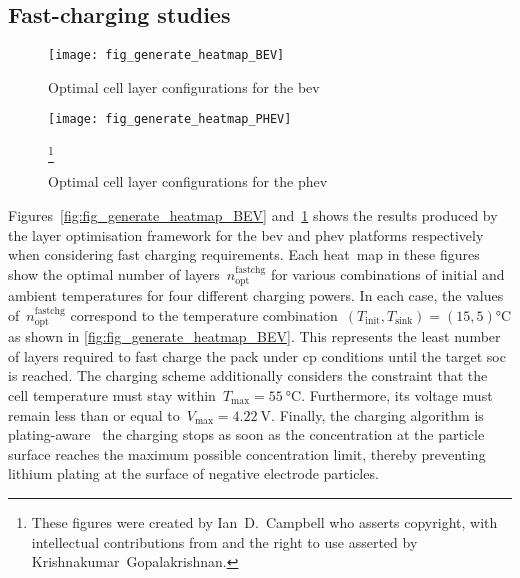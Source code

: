 \subsection{Fast-charging studies}

\begin{figure}[p]
    \begin{minipage}[t]{\textwidth}
        \centering
        \texttt{[image: fig\_generate\_heatmap\_BEV]}
        \captionsetup{labelsep=note}
        \caption[Optimal cell layer configurations for the \gls{bev}, presented for a range of fast charging powers and thermal conditions]{Optimal cell layer configurations for the \gls{bev}}
        \label{fig:fig_generate_heatmap_BEV}
        \setcounter{footnote}{8}
        \vspace*{\floatsep}
        \texttt{[image: fig\_generate\_heatmap\_PHEV]}
        \caption[Optimal cell layer configurations for the \gls{phev}, presented for a range of
        fast charging powers and thermal conditions]{Optimal cell layer configurations for the \gls{phev}}
        \label{fig:fig_generate_heatmap_PHEV}
        \mpfootnotes[1]
        \footnote{These figures were created by \mbox{Ian D.\ Campbell} who asserts copyright,
            with intellectual contributions from and the right to use asserted by
        \mbox{Krishnakumar Gopalakrishnan}.}
    \end{minipage}
\end{figure}

Figures~\ref{fig:fig_generate_heatmap_BEV}
and~\ref{fig:fig_generate_heatmap_PHEV} shows the results  produced by the layer
optimisation framework  for the \gls{bev} and  \gls{phev} platforms respectively
when  considering fast  charging requirements.  Each heat~map  in these  figures
show  the optimal  number  of  layers~$n^\text{fastchg}_\text{opt}$ for  various
combinations of  initial and  ambient temperatures  for four  different charging
powers. In each case, the  values of~$n^\text{fastchg}_\text{opt}$ correspond to
the  temperature  combination~${(T_\text{init},T_\text{sink})  =  (15,  5)
\si{\degreeCelsius}}$  as  shown  in  \cref{fig:fig_generate_heatmap_BEV}.  This
represents the  least number of  layers required to  fast charge the  pack under
\gls{cp} conditions until  the target \gls{soc} is reached.  The charging scheme
additionally considers the constraint that the cell temperature must stay
within~${T_\text{max}=  \SI{55}{\degreeCelsius}}$. Furthermore,  its voltage  must
remain less than or equal  to~${V_\text{max} = \SI{4.22}{\volt}}$. Finally,
the charging algorithm is plating-aware \ie~the charging stops as soon as the
concentration at the particle surface reaches the maximum possible concentration
limit, thereby preventing  lithium plating at the surface  of negative electrode
particles.


